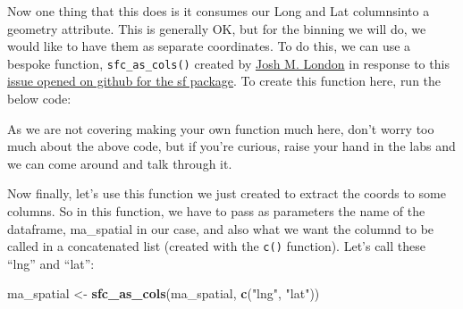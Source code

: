 \documentclass[]{book}
\newenvironment{Shaded}{\begin{snugshade}}{\end{snugshade}}
\newcommand{\ControlFlowTok}[1]{\textcolor[rgb]{0.13,0.29,0.53}{\textbf{#1}}}
\newcommand{\DataTypeTok}[1]{\textcolor[rgb]{0.13,0.29,0.53}{#1}}
\newcommand{\KeywordTok}[1]{\textcolor[rgb]{0.13,0.29,0.53}{\textbf{#1}}}
\newcommand{\NormalTok}[1]{#1}
\newcommand{\OperatorTok}[1]{\textcolor[rgb]{0.81,0.36,0.00}{\textbf{#1}}}
\newcommand{\StringTok}[1]{\textcolor[rgb]{0.31,0.60,0.02}{#1}}
\begin{document}
Now one thing that this does is it consumes our Long and Lat columnsinto a geometry attribute. This is generally OK, but for the binning we will do, we would like to have them as separate coordinates. To do this, we can use a bespoke function, \texttt{sfc\_as\_cols()} created by \href{https://github.com/jmlondon}{Josh M. London} in response to this \href{https://github.com/r-spatial/sf/issues/231}{issue opened on github for the sf package}. To create this function here, run the below code:

\begin{Shaded}
\end{Shaded}

As we are not covering making your own function much here, don't worry too much about the above code, but if you're curious, raise your hand in the labs and we can come around and talk through it.

Now finally, let's use this function we just created to extract the coords to some columns. So in this function, we have to pass as parameters the name of the dataframe, ma\_spatial in our case, and also what we want the columnd to be called in a concatenated list (created with the \texttt{c()} function). Let's call these ``lng'' and ``lat'':

\begin{Shaded}
\begin{Highlighting}[]
\NormalTok{ma_spatial <-}\StringTok{ }\KeywordTok{sfc_as_cols}\NormalTok{(ma_spatial, }\KeywordTok{c}\NormalTok{(}\StringTok{"lng"}\NormalTok{, }\StringTok{"lat"}\NormalTok{))}
\end{Highlighting}
\end{Shaded}
\end{document}
